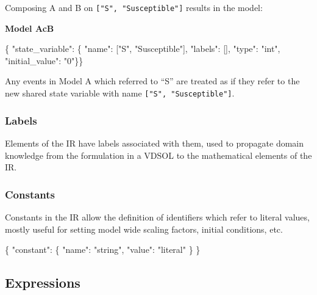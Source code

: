 \documentclass[]{article}
\newenvironment{Shaded}{}{}
\newcommand{\DataTypeTok}[1]{\textcolor[rgb]{0.56,0.13,0.00}{#1}}
\newcommand{\StringTok}[1]{\textcolor[rgb]{0.25,0.44,0.63}{#1}}
\newcommand{\OtherTok}[1]{\textcolor[rgb]{0.00,0.44,0.13}{#1}}
\newcommand{\FunctionTok}[1]{\textcolor[rgb]{0.02,0.16,0.49}{#1}}
\begin{document}
Composing A and B on \texttt{{[}"S",\ "Susceptible"{]}} results in the
model:

\textbf{Model AcB}

\begin{Shaded}
\begin{Highlighting}[]
\FunctionTok{\{} \DataTypeTok{"state_variable"}\FunctionTok{:} \FunctionTok{\{} \DataTypeTok{"name"}\FunctionTok{:} \OtherTok{[}\StringTok{"S"}\OtherTok{,} \StringTok{"Susceptible"}\OtherTok{]}\FunctionTok{,} \DataTypeTok{"labels"}\FunctionTok{:} \OtherTok{[]}\FunctionTok{,} \DataTypeTok{"type"}\FunctionTok{:} \StringTok{"int"}\FunctionTok{,}
    \DataTypeTok{"initial_value"}\FunctionTok{:} \StringTok{"0"}\FunctionTok{\}\}}
\end{Highlighting}
\end{Shaded}

Any events in Model A which referred to ``S'' are treated as if they
refer to the new shared state variable with name
\texttt{{[}"S",\ "Susceptible"{]}}.

\subsubsection{Labels}\label{labels}

Elements of the IR have labels associated with them, used to propagate
domain knowledge from the formulation in a VDSOL to the mathematical
elements of the IR.

\subsubsection{Constants}\label{constants}

Constants in the IR allow the definition of identifiers which refer to
literal values, mostly useful for setting model wide scaling factors,
initial conditions, etc.

\begin{Shaded}
\begin{Highlighting}[]
\FunctionTok{\{} \DataTypeTok{"constant"}\FunctionTok{:} \FunctionTok{\{}
    \DataTypeTok{"name"}\FunctionTok{:} \StringTok{"string"}\FunctionTok{,}
    \DataTypeTok{"value"}\FunctionTok{:} \StringTok{"literal"}
  \FunctionTok{\}}
\FunctionTok{\}}
\end{Highlighting}
\end{Shaded}

\subsection{Expressions}\label{expressions}
\end{document}
